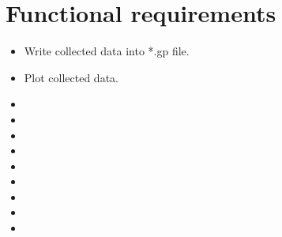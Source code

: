 {


\setcounter{func}{10}
\renewcommand{\labelitemi}{
	\ifnum \value{func}<10$/F 0\arabic{func} /$\addtocounter{func}{10}
	\else $/F \arabic{func} /$\addtocounter{func}{10}\fi
	}

\section{Functional requirements} 
	\begin{itemize}
		\item Write collected data into *.gp file.
		\item Plot collected data.
		\item
		\item
		\item
		\item
		\item
		\item
		\item
		\item
		\item
	\end{itemize}
}